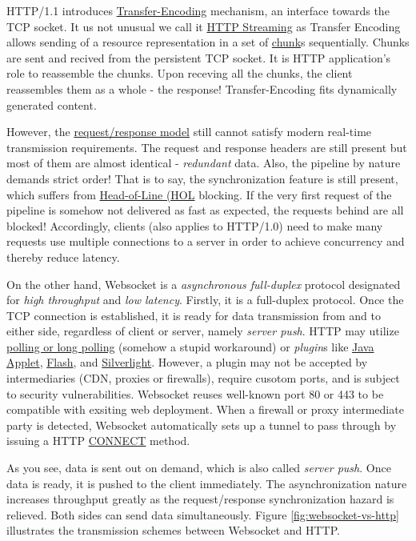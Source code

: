 HTTP/1.1 introduces
\href{https://tools.ietf.org/html/rfc7230#section-3.3.1}{Transfer-Encoding}
mechanism, an interface towards the TCP socket. It us not unusual
we call it \uline{HTTP Streaming} as Transfer Encoding allows
sending of a resource representation in a set of \uline{chunk}s
sequentially. Chunks are sent and recived from the persistent TCP
socket. It is HTTP application's role to reassemble the
chunks. Upon receving all the chunks, the client reassembles them
as a whole - the response! Transfer-Encoding fits dynamically
generated content.

However, the \uline{request/response model} still cannot satisfy
modern real-time transmission requirements. The request and
response headers are still present but most of them are almost
identical - \textit{redundant} data. Also, the pipeline by nature
demands strict order! That is to say, the synchronization feature
is still present, which suffers from
\href{https://stackoverflow.com/q/45583861}{Head-of-Line (HOL}
blocking. If the very first request of the pipeline is somehow not
delivered as fast as expected, the requests behind are all
blocked!  Accordingly, clients (also applies to HTTP/1.0) need to
make many requests use multiple connections to a server in order
to achieve concurrency and thereby reduce latency.

On the other hand, Websocket is a \textit{asynchronous
  full-duplex} protocol designated for \textit{high throughput}
and \textit{low latency}. Firstly, it is a full-duplex
protocol. Once the TCP connection is established, it is ready for
data transmission from and to either side, regardless of client or
server, namely \textit{server push}. HTTP may utilize
\href{https://stackoverflow.com/q/12555043}{polling or long
  polling} (somehow a stupid workaround) or \textit{plugin}s like
\uline{Java Applet}, \uline{Flash}, and
\uline{Silverlight}. However, a plugin may not be accepted by
intermediaries (CDN, proxies or firewalls), require cusotom ports,
and is subject to security vulnerabilities. Websocket reuses
well-known port 80 or 443 to be compatible with exsiting web
deployment. When a firewall or proxy intermediate party is
detected, Websocket automatically sets up a tunnel to pass through
by issuing a HTTP \uline{CONNECT} method.

As you see, data is sent out on demand, which is also called
\textit{server push}. Once data is ready, it is pushed to the
client immediately. The asynchronization nature increases
throughput greatly as the request/response synchronization hazard
is relieved. Both sides can send data simultaneously. Figure
\ref{fig:websocket-vs-http} illustrates the transmission schemes
between Websocket and HTTP.

